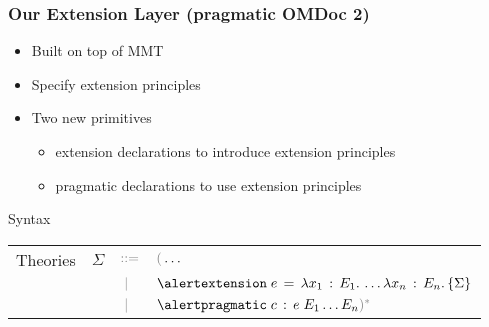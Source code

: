 \begin{frame}
\frametitle{Our Extension Layer (pragmatic OMDoc 2)}
\begin{itemize}
\item Built on top of MMT
\vspace{.5em}
\item Specify extension principles {\color{blue}{declaratively}}
\vspace{.5em}
\item Two new primitives 
\begin{itemize}
\vspace{.3em}
\item \alert{extension declarations} to {\color{blue}introduce} extension principles
\vspace{.3em}
\item \alert{pragmatic declarations} to {\color{blue}use} extension principles
\end{itemize}
\end{itemize}
\begin{block}{Syntax}
\begin{tabular}{llll}
Theories        &$\Sigma$ &$\bnfas$  & $\bnf{(}\ldots$\\[.3em]%
                &         &$\bnfalts$& $\extInGrammar{e}{\Lam[E_1]{x_1}\ldots\Lam[E_n]{x_n}\{\Sigma\}}$\\[.3em]
                &         &$\bnfalts$& $\pragInGrammar{c}{e\;E_1\ldots E_n}\bnf{)}^{\bnf{\ast}}$\\

\end{tabular}
\end{block}
\end{frame}


